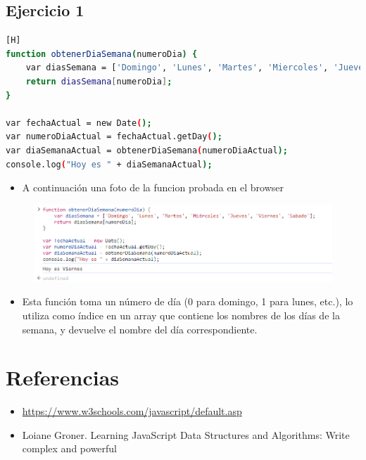 \documentclass{article}
\begin{document}
 	\subsection{Ejercicio 1}
		\begin{lstlisting}[language=bash,caption={Código del JavaScript}][H]
function obtenerDiaSemana(numeroDia) {
    var diasSemana = ['Domingo', 'Lunes', 'Martes', 'Miercoles', 'Jueves', 'Viernes', 'Sabado'];
    return diasSemana[numeroDia];
}

var fechaActual = new Date();
var numeroDiaActual = fechaActual.getDay();
var diaSemanaActual = obtenerDiaSemana(numeroDiaActual);
console.log("Hoy es " + diaSemanaActual);
		\end{lstlisting}
	\begin{itemize}
			\item A continuación una foto de la funcion probada en el browser
		\end{itemize} 
		\begin{figure}[H]
			\centering
			\includegraphics[width=1.0\textwidth,keepaspectratio]{img/ejercicio1.PNG}
		\end{figure}
		\begin{itemize}
			\item Esta función toma un número de día (0 para domingo, 1 para lunes, etc.), lo utiliza como índice en un array que contiene los nombres de los días de la semana, y devuelve el nombre del día correspondiente.
		\end{itemize} 
\section{Referencias}
\begin{itemize}			
	\item \url{https://www.w3schools.com/javascript/default.asp}
	\item	Loiane Groner. Learning JavaScript Data Structures and Algorithms: Write complex and powerful
\end{itemize}	
	
%
%
%
			
\end{document}

